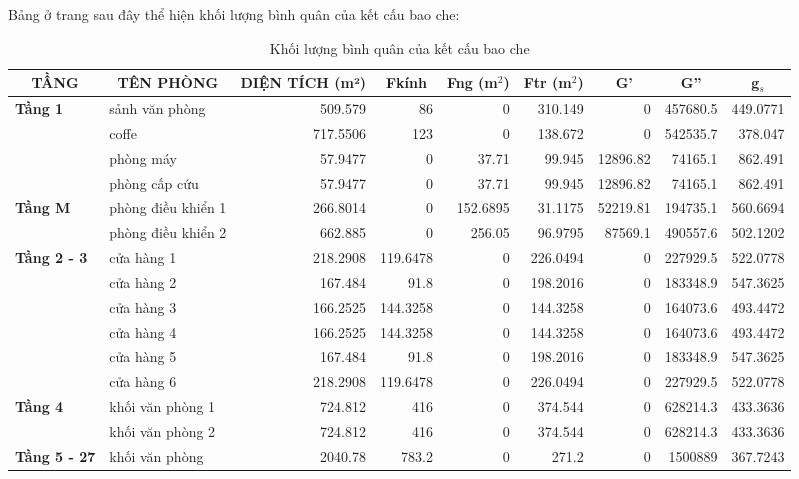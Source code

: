 Bảng ở trang sau đây thể hiện khối lượng bình quân của kết cấu bao che:
\begin{landscape}
\begin{table}[H]
	\vspace{0.5cm}
	\centering
	\begin{tabular}{|l|l|r|r|r|r|r|r|r|}
		\hline
		\multicolumn{1}{|c|}{\textbf{ TẦNG}} & \multicolumn{1}{c|}{\textbf{TÊN PHÒNG}} & \multicolumn{1}{c|}{\textbf{DIỆN TÍCH (m²) }} & \multicolumn{1}{c|}{\textbf{F{\scriptsize kính}}} & \multicolumn{1}{c|}{\textbf{F{\scriptsize ng} (m$^2$)}} & \multicolumn{1}{c|}{\textbf{F{\scriptsize tr} (m$^2$)}} & \multicolumn{1}{c|}{\textbf{G'}} & \multicolumn{1}{c|}{\textbf{G''}} & \multicolumn{1}{c|}{\textbf{g$_{s}$}} \bigstrut\\
		\hline
		\textbf{Tầng 1} & sảnh văn phòng & 509.579 & 86    & 0     & 310.149 & 0     & 457680.5 & 449.0771 \bigstrut\\
		\hline
		& coffe & 717.5506 & 123   & 0     & 138.672 & 0     & 542535.7 & 378.047 \bigstrut\\
		\hline
		& phòng máy & 57.9477 & 0     & 37.71 & 99.945 & 12896.82 & 74165.1 & 862.491 \bigstrut\\
		\hline
		& phòng cấp cứu & 57.9477 & 0     & 37.71 & 99.945 & 12896.82 & 74165.1 & 862.491 \bigstrut\\
		\hline
		\textbf{Tầng M} & phòng điều khiển 1 & 266.8014 & 0     & 152.6895 & 31.1175 & 52219.81 & 194735.1 & 560.6694 \bigstrut\\
		\hline
		& phòng điều khiển 2 & 662.885 & 0     & 256.05 & 96.9795 & 87569.1 & 490557.6 & 502.1202 \bigstrut\\
		\hline
		\textbf{Tầng 2 - 3} & cửa hàng 1 & 218.2908 & 119.6478 & 0     & 226.0494 & 0     & 227929.5 & 522.0778 \bigstrut\\
		\hline
		& cửa hàng 2 & 167.484 & 91.8  & 0     & 198.2016 & 0     & 183348.9 & 547.3625 \bigstrut\\
		\hline
		& cửa hàng 3 & 166.2525 & 144.3258 & 0     & 144.3258 & 0     & 164073.6 & 493.4472 \bigstrut\\
		\hline
		& cửa hàng 4 & 166.2525 & 144.3258 & 0     & 144.3258 & 0     & 164073.6 & 493.4472 \bigstrut\\
		\hline
		& cửa hàng 5 & 167.484 & 91.8  & 0     & 198.2016 & 0     & 183348.9 & 547.3625 \bigstrut\\
		\hline
		& cửa hàng 6 & 218.2908 & 119.6478 & 0     & 226.0494 & 0     & 227929.5 & 522.0778 \bigstrut\\
		\hline
		\textbf{Tầng 4} & khối văn phòng 1 & 724.812 & 416   & 0     & 374.544 & 0     & 628214.3 & 433.3636 \bigstrut\\
		\hline
		& khối văn phòng 2 & 724.812 & 416   & 0     & 374.544 & 0     & 628214.3 & 433.3636 \bigstrut\\
		\hline
		\textbf{Tầng 5 - 27} & khối văn phòng & 2040.78 & 783.2 & 0     & 271.2 & 0     & 1500889 & 367.7243 \bigstrut\\
		\hline
	\end{tabular}%
	\caption{Khối lượng bình quân của kết cấu bao che}
	\label{b:klkcbc}%
\end{table}%
\end{landscape}


